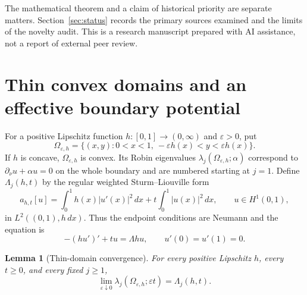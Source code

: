 \documentclass[11pt,a4paper]{article}
\newtheorem{lemma}[theorem]{Lemma}
\theoremstyle{definition}\newtheorem{definition}[theorem]{Definition}
\theoremstyle{remark}\newtheorem{remark}[theorem]{Remark}
\begin{document}
The mathematical theorem and a claim of historical priority are
separate matters. Section~\ref{sec:status} records the primary
sources examined and the limits of the novelty audit. This is a
research manuscript prepared with AI assistance, not a report of
external peer review.

\section{Thin convex domains and an effective boundary potential}

For a positive Lipschitz function $h:[0,1]\to(0,\infty)$ and
$\varepsilon>0$, put
\[
 \Omega_{\varepsilon,h}
 =\{(x,y):0<x<1,\ -\varepsilon h(x)<y<\varepsilon h(x)\}.
\]
If $h$ is concave, $\Omega_{\varepsilon,h}$ is convex. Its Robin
eigenvalues $\lambda_j(\Omega_{\varepsilon,h};\alpha)$ correspond to
$\partial_\nu u+\alpha u=0$ on the whole boundary and are numbered
starting at $j=1$. Define $\Lambda_j(h,t)$ by the regular weighted
Sturm--Liouville form
\begin{equation}\label{eq:effective-form}
 a_{h,t}[u]=\int_0^1h(x)|u'(x)|^2\,dx
              +t\int_0^1|u(x)|^2\,dx,
 \qquad u\in H^1(0,1),
\end{equation}
in $L^2((0,1),h\,dx)$. Thus the endpoint conditions are Neumann and
the equation is
\[
 -(hu')'+tu=\Lambda hu,\qquad u'(0)=u'(1)=0.
\]

\begin{lemma}[Thin-domain convergence]\label{lem:thin-convergence}
For every positive Lipschitz $h$, every $t\geq0$, and every fixed
$j\geq1$,
\begin{equation}\label{eq:thin-limit}
 \lim_{\varepsilon\downarrow0}
 \lambda_j(\Omega_{\varepsilon,h};\varepsilon t)
 =\Lambda_j(h,t).
\end{equation}
\end{lemma}
\end{document}
